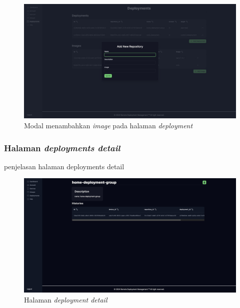 \begin{figure}[h]
  \centering
  \includegraphics[width=1\textwidth]{resources/chapter-4/dashboard/deployment-page-add-repostory.jpg}
  \caption{Modal menambahkan \textit{image} pada halaman \textit{deployment}}
  \label{fig:halaman-deployment-add-repostory}
\end{figure}

\pagebreak

\subsubsection{Halaman \textit{deployments detail}}
penjelasan halaman deployments detail
\begin{figure}[h]
  \centering
  \includegraphics[width=1\textwidth]{resources/chapter-4/dashboard/deployment-detail-page.jpg}
  \caption{Halaman \textit{deployment detail}}
  \label{fig:halaman-deployment-detail}
\end{figure}

